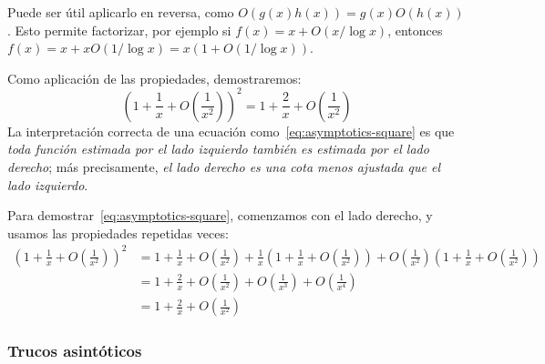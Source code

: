 \begin{description}
    Puede ser útil aplicarlo en reversa,
    como \(O(g(x) h(x)) = g(x) O(h(x))\).
    Esto permite factorizar,
    por ejemplo si \(f(x) = x + O(x / \log x)\),
    entonces \(f(x) = x + x O(1 / \log x) = x (1 + O(1 / \log x))\).
  \end{description}

  Como aplicación de las propiedades,
  demostraremos:
  \begin{equation}
    \label{eq:asymptotics-square}
    \left( 1 + \frac{1}{x} + O\left( \frac{1}{x^2} \right) \right)^2
      = 1 + \frac{2}{x} + O\left( \frac{1}{x^2} \right)
  \end{equation}
  La interpretación correcta
  de una ecuación como~\eqref{eq:asymptotics-square}
  es que
  \emph{toda función estimada por el lado izquierdo
        también es estimada por el lado derecho};
  más precisamente,
  \emph{el lado derecho es una cota menos ajustada que el lado izquierdo}.

  Para demostrar~\eqref{eq:asymptotics-square},
  comenzamos con el lado derecho,
  y usamos las propiedades repetidas veces:
  \begin{align*}
    \left( 1 + \frac{1}{x} + O\left( \frac{1}{x^2} \right) \right)^2
      &= 1 + \frac{1}{x} + O\left( \frac{1}{x^2} \right)
           + \frac{1}{x}
                 \left(
                   1 + \frac{1}{x} + O\left( \frac{1}{x^2} \right)
                 \right)
           + O\left( \frac{1}{x^2} \right)
                 \left(
                   1 + \frac{1}{x} + O\left( \frac{1}{x^2} \right)
                 \right) \\
      &= 1 + \frac{2}{x}
           + O\left( \frac{1}{x^2} \right)
           + O\left( \frac{1}{x^3} \right)
           + O\left( \frac{1}{x^4} \right) \\
      &= 1 + \frac{2}{x} + O\left( \frac{1}{x^2} \right)
  \end{align*}

\subsubsection{Trucos asintóticos}
\label{sec:asymptotic-tricks}

